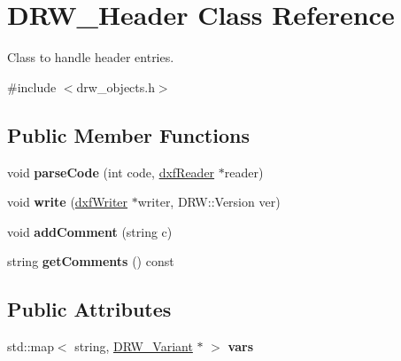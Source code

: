 \hypertarget{classDRW__Header}{\section{D\-R\-W\-\_\-\-Header Class Reference}
\label{classDRW__Header}
}


Class to handle header entries.  




{\ttfamily \#include $<$drw\-\_\-objects.\-h$>$}

\subsection*{Public Member Functions}
\begin{DoxyCompactItemize}
\item 
\hypertarget{classDRW__Header_aee3008b82ee4714d873d6ec58567a8af}{void {\bfseries parse\-Code} (int code, \hyperlink{classdxfReader}{dxf\-Reader} $\ast$reader)}\label{classDRW__Header_aee3008b82ee4714d873d6ec58567a8af}

\item 
\hypertarget{classDRW__Header_a4b13419129531edf1a844e78985fd8ad}{void {\bfseries write} (\hyperlink{classdxfWriter}{dxf\-Writer} $\ast$writer, D\-R\-W\-::\-Version ver)}\label{classDRW__Header_a4b13419129531edf1a844e78985fd8ad}

\item 
\hypertarget{classDRW__Header_ac4a0ed119b51a1184c39296e93faa0c9}{void {\bfseries add\-Comment} (string c)}\label{classDRW__Header_ac4a0ed119b51a1184c39296e93faa0c9}

\item 
\hypertarget{classDRW__Header_a2c5e33853eb9400fb2bf6bac0bc6643d}{string {\bfseries get\-Comments} () const }\label{classDRW__Header_a2c5e33853eb9400fb2bf6bac0bc6643d}

\end{DoxyCompactItemize}
\subsection*{Public Attributes}
\begin{DoxyCompactItemize}
\item 
\hypertarget{classDRW__Header_a28b836ba15f4f0794a0e263bc927f0a8}{std\-::map$<$ string, \hyperlink{classDRW__Variant}{D\-R\-W\-\_\-\-Variant} $\ast$ $>$ {\bfseries vars}}\label{classDRW__Header_a28b836ba15f4f0794a0e263bc927f0a8}

\end{DoxyCompactItemize}


